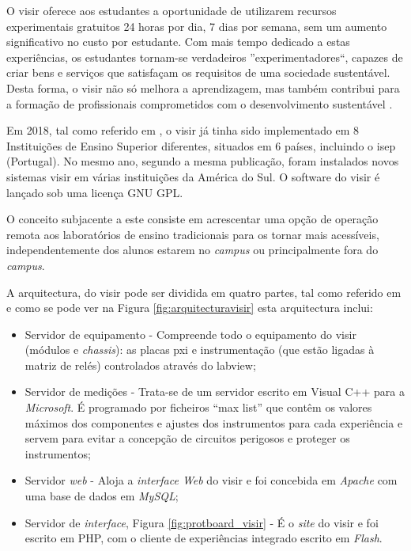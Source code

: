 O \acrshort{visir} oferece aos estudantes a oportunidade de utilizarem recursos experimentais gratuitos 24 horas por dia, 7 dias por semana, sem um aumento significativo no custo por estudante. Com mais tempo dedicado a estas experiências, os estudantes tornam-se verdadeiros ''experimentadores``, capazes de criar bens e serviços que satisfaçam os requisitos de uma sociedade sustentável. Desta forma, o \acrshort{visir} não só melhora a aprendizagem, mas também contribui para a formação de profissionais comprometidos com o desenvolvimento sustentável \cite{OpenLabs77:online}.

Em 2018, tal como referido em \cite{PILARFederationVISIR}, o \acrshort{visir} já tinha sido implementado em 8 Instituições de Ensino Superior diferentes, situados em 6 países, incluindo o \acrshort{isep} (Portugal). No mesmo ano, segundo a mesma publicação, foram instalados novos sistemas \acrshort{visir} em várias instituições da América do Sul. O software do \acrshort{visir} é lançado sob uma licença GNU GPL. 

O conceito subjacente a este consiste em acrescentar uma opção de operação remota aos laboratórios de ensino tradicionais para os tornar mais acessíveis, independentemente dos alunos estarem no \textit{campus} ou principalmente fora do \textit{campus}\cite{TheVISIRproject}.

A arquitectura, do \acrshort{visir} pode ser dividida em quatro partes, tal como referido em \cite{tawfikexperiences} e como se pode ver na Figura \ref{fig:arquitecturavisir} esta arquitectura inclui: 
\begin{itemize}
    \item Servidor de equipamento - Compreende todo o equipamento do \acrshort{visir} (módulos e \textit{chassis}): as placas \acrfull{pxi} e instrumentação (que estão ligadas à matriz de relés) controlados através do \acrshort{labview};
    \item Servidor de medições - Trata-se de um servidor escrito em Visual C++ para a \textit{Microsoft}. É programado por ficheiros ``max list'' que contêm os valores máximos dos componentes e ajustes dos instrumentos para cada experiência e servem para evitar a concepção de circuitos perigosos e proteger os instrumentos;
    \item Servidor \textit{web} - Aloja a \textit{interface Web} do \acrshort{visir} e foi concebida em \textit{Apache} com uma base de dados em \textit{MySQL};
    \item Servidor de \textit{interface}, Figura \ref{fig:protboard_visir} - É o \textit{site} do \acrshort{visir} e foi escrito em PHP, com o cliente de experiências integrado escrito em \textit{Flash}.
    \end{itemize}

